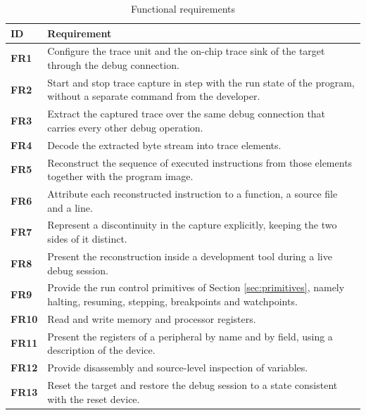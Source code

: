\begin{table}[H]
    \centering
    \caption{Functional requirements}
    \label{tab:fr}
    \begin{tabularx}{\linewidth}{| @{}>{\hsize\bfseries}Y | >{\hsize}Y@{} |}
        \hline
        ID & \textbf{Requirement} \\
        \hline
        FR1 & Configure the trace unit and the on-chip trace sink of the target through the debug connection. \\
        \hline
        FR2 & Start and stop trace capture in step with the run state of the program, without a separate command from the developer. \\
        \hline
        FR3 & Extract the captured trace over the same debug connection that carries every other debug operation. \\
        \hline
        FR4 & Decode the extracted byte stream into trace elements. \\
        \hline
        FR5 & Reconstruct the sequence of executed instructions from those elements together with the program image. \\
        \hline
        FR6 & Attribute each reconstructed instruction to a function, a source file and a line. \\
        \hline
        FR7 & Represent a discontinuity in the capture explicitly, keeping the two sides of it distinct. \\
        \hline
        FR8 & Present the reconstruction inside a development tool during a live debug session. \\
        \hline
        FR9 & Provide the run control primitives of Section \ref{sec:primitives}, namely halting, resuming, stepping, breakpoints and watchpoints. \\
        \hline
        FR10 & Read and write memory and processor registers. \\
        \hline
        FR11 & Present the registers of a peripheral by name and by field, using a description of the device. \\
        \hline
        FR12 & Provide disassembly and source-level inspection of variables. \\
        \hline
        FR13 & Reset the target and restore the debug session to a state consistent with the reset device. \\
        \hline
    \end{tabularx}
\end{table}

